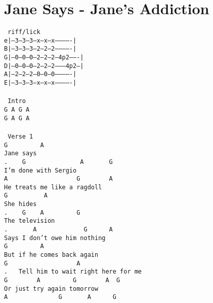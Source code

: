 \newpage
\section{Jane Says - Jane's Addiction}
\label{Jane Says - Jane's Addiction}
\texttt{\lbrack\ riff/lick \rbrack\\
e|--3---3---3---x---x---x-------------|\\
B|--3---3---3---2---2---2-------------|\\
G|--0---0---0---2---2---2---4p2-------|\\
D|--0---0---0---2---2---2--------4p2--|\\
A|--2---2---2---0---0---0-------------|\\
E|--3---3---3---x---x---x-------------|\\
\\
\lbrack\ Intro\rbrack\\
G\ A\ G\ A\\
G\ A\ G\ A\\
\\
\lbrack\ Verse\ 1\rbrack\\
G\ \ \ \ \ \ \ \ \ A\\
Jane\ says\\
.\ \ \ \ G\ \ \ \ \ \ \ \ \ \ \ \ \ \ \ A\ \ \ \ \ \ \ G\\
I'm\ done\ with\ Sergio\\
A\ \ \ \ \ \ \ \ \ \ \ \ \ \ \ \ \ \ \ G\ \ \ \ \ \ \ \ A\\
He\ treats\ me\ like\ a\ ragdoll\\
G\ \ \ \ \ \ \ \ \ \ A\\
She\ hides\\
.\ \ \ \ G\ \ \ \ A\ \ \ \ \ \ \ \ \ G\\
The\ television\\
.\ \ \ \ \ \ \ A\ \ \ \ \ \ \ \ \ \ \ \ \ G\ \ \ \ \ \ A\\
Says\ I\ don't\ owe\ him\ nothing\\
G\ \ \ \ \ \ \ \ \ A\\
But\ if\ he\ comes\ back\ again\\
G\ \ \ \ \ \ \ \ \ \ \ \ \ \ \ \ \ \ \ A\\
.\ \ \ Tell\ him\ to\ wait\ right\ here\ for\ me\\
G\ \ \ \ \ \ \ \ A\ \ \ \ \ \ \ \ \ G\ \ \ \ \ \ \ \ A\ \ G\\
Or\ just\ try\ again\ tomorrow\\
A\ \ \ \ \ \ \ \ \ \ \ \ \ \ G\ \ \ \ \ \ \ A\ \ \ \ \ \ G\\
}
